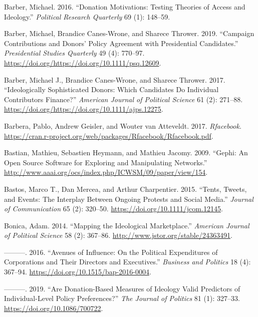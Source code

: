 \documentclass[12pt,]{article}
\begin{document}
\leavevmode\hypertarget{ref-barber2016a}{}%
Barber, Michael. 2016. ``Donation Motivations: Testing Theories of
Access and Ideology.'' \emph{Political Research Quarterly} 69 (1):
148--59.

\leavevmode\hypertarget{ref-barber2019}{}%
Barber, Michael, Brandice Canes-Wrone, and Sharece Thrower. 2019.
``Campaign Contributions and Donors' Policy Agreement with Presidential
Candidates.'' \emph{Presidential Studies Quarterly} 49 (4): 770--97.
\url{https://doi.org/https://doi.org/10.1111/psq.12609}.

\leavevmode\hypertarget{ref-barber2017}{}%
Barber, Michael J., Brandice Canes-Wrone, and Sharece Thrower. 2017.
``Ideologically Sophisticated Donors: Which Candidates Do Individual
Contributors Finance?'' \emph{American Journal of Political Science} 61
(2): 271--88. \url{https://doi.org/https://doi.org/10.1111/ajps.12275}.

\leavevmode\hypertarget{ref-rfacebook}{}%
Barbera, Pablo, Andrew Geisler, and Wouter van Atteveldt. 2017.
\emph{Rfacebook}.
\url{https://cran.r-project.org/web/packages/Rfacebook/Rfacebook.pdf}.

\leavevmode\hypertarget{ref-gephi}{}%
Bastian, Mathieu, Sebastien Heymann, and Mathieu Jacomy. 2009. ``Gephi:
An Open Source Software for Exploring and Manipulating Networks.''
\url{http://www.aaai.org/ocs/index.php/ICWSM/09/paper/view/154}.

\leavevmode\hypertarget{ref-bastos2015}{}%
Bastos, Marco T., Dan Mercea, and Arthur Charpentier. 2015. ``Tents,
Tweets, and Events: The Interplay Between Ongoing Protests and Social
Media.'' \emph{Journal of Communication} 65 (2): 320--50.
\url{https://doi.org/10.1111/jcom.12145}.

\leavevmode\hypertarget{ref-bonica2014}{}%
Bonica, Adam. 2014. ``Mapping the Ideological Marketplace.''
\emph{American Journal of Political Science} 58 (2): 367--86.
\url{http://www.jstor.org/stable/24363491}.

\leavevmode\hypertarget{ref-bonica2016}{}%
---------. 2016. ``Avenues of Influence: On the Political Expenditures
of Corporations and Their Directors and Executives.'' \emph{Business and
Politics} 18 (4): 367--94. \url{https://doi.org/10.1515/bap-2016-0004}.

\leavevmode\hypertarget{ref-bonica2019}{}%
---------. 2019. ``Are Donation-Based Measures of Ideology Valid
Predictors of Individual-Level Policy Preferences?'' \emph{The Journal
of Politics} 81 (1): 327--33. \url{https://doi.org/10.1086/700722}.
\end{document}
